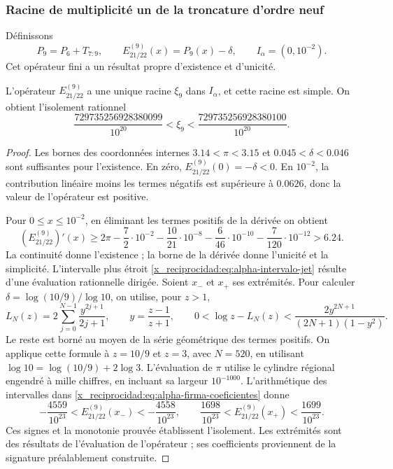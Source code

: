 \subsubsection{Racine de multiplicité un de la troncature d'ordre neuf}
\label{x_reciprocidad:subsec:alpha-jet}

Définissons
\[
 P_9=P_6+T_{7:9},\qquad E_{21/22}^{(9)}(x)=P_9(x)-\delta,
 \qquad I_\alpha=(0,10^{-2}).
\]
Cet opérateur fini a un résultat propre d'existence et d'unicité.

\begin{proposition}
\label{x_reciprocidad:prop:alpha-raiz-jet}
L'opérateur \(E_{21/22}^{(9)}\) a une unique racine \(\xi_9\) dans \(I_\alpha\), et cette racine est simple. On obtient l'isolement rationnel
\begin{equation}
 \frac{729735256928380099}{10^{20}}
 <\xi_9<\frac{729735256928380100}{10^{20}}.
 \label{x_reciprocidad:eq:alpha-intervalo-jet}
\end{equation}
\end{proposition}

\begin{proof}
Les bornes des coordonnées internes
\(3.14<\pi<3.15\) et
\(0.045<\delta<0.046\) sont suffisantes pour l'existence. En zéro,
\(E_{21/22}^{(9)}(0)=-\delta<0\). En \(10^{-2}\), la contribution
linéaire moins les termes négatifs est supérieure à \(0.0626\), donc la
valeur de l'opérateur est positive.

Pour \(0\leq x\leq10^{-2}\), en éliminant les termes positifs de
la dérivée on obtient
\[
 (E_{21/22}^{(9)})'(x)
 \geq2\pi-\frac72\cdot10^{-2}
 -\frac{10}{21}\cdot10^{-8}-\frac6{46}\cdot10^{-10}
 -\frac7{120}\cdot10^{-12}>6.24.
\]
La continuité donne l'existence ; la borne de la dérivée donne l'unicité et la simplicité. L'intervalle plus étroit \eqref{x_reciprocidad:eq:alpha-intervalo-jet} résulte d'une évaluation rationnelle dirigée. Soient \(x_-\) et \(x_+\) ses extrémités. Pour calculer \(\delta=\log(10/9)/\log 10\), on utilise, pour \(z>1\),
\[
 L_N(z)=2\sum_{j=0}^{N-1}\frac{y^{2j+1}}{2j+1},\qquad
 y=\frac{z-1}{z+1},\qquad
 0<\log z-L_N(z)<\frac{2y^{2N+1}}{(2N+1)(1-y^2)}.
\]
Le reste est borné au moyen de la série géométrique des termes positifs.
On applique cette formule à \(z=10/9\) et \(z=3\), avec \(N=520\),
en utilisant \(\log 10=\log(10/9)+2\log3\). L’évaluation de
\(\pi\) utilise le cylindre régional engendré à mille chiffres, en incluant
sa largeur \(10^{-1000}\). L’arithmétique des intervalles dans
\eqref{x_reciprocidad:eq:alpha-firma-coeficientes} donne
\[
 -\frac{4559}{10^{23}}<E_{21/22}^{(9)}(x_-)< -\frac{4558}{10^{23}},
 \qquad
 \frac{1698}{10^{23}}<E_{21/22}^{(9)}(x_+)<\frac{1699}{10^{23}}.
\]
Ces signes et la monotonie prouvée établissent l’isolement. Les extrémités
sont des résultats de l’évaluation de l’opérateur ; ses coefficients proviennent de
la signature préalablement construite.
\end{proof}

